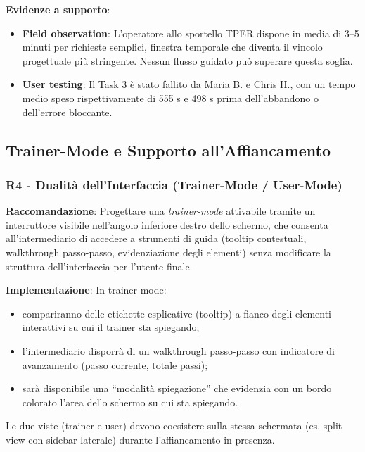 ﻿\documentclass[11pt,a4paper]{article}
\begin{document}
\textbf{Evidenze a supporto}:
\begin{itemize}
    \item \textbf{Field observation}: L'operatore allo sportello TPER dispone in media
    di 3--5 minuti per richieste semplici, finestra temporale che
    diventa il vincolo progettuale pi\`u stringente. Nessun flusso guidato pu\`o
    superare questa soglia.
    \item \textbf{User testing}: Il Task 3 \`e stato fallito da Maria B.
    e Chris H., con un tempo medio speso rispettivamente di 555 s e 498 s
    prima dell'abbandono o dell'errore bloccante.
\end{itemize}



\subsection{Trainer-Mode e Supporto all'Affiancamento}

\subsubsection{R4 - Dualit\`a dell'Interfaccia (Trainer-Mode / User-Mode)}
\label{rec:R4}

\textbf{Raccomandazione}: Progettare una \textit{trainer-mode} attivabile
tramite un interruttore visibile nell'angolo inferiore destro dello schermo,
che consenta all'intermediario di accedere a strumenti di guida (tooltip
contestuali, walkthrough passo-passo, evidenziazione degli elementi)
senza modificare la struttura dell'interfaccia per l'utente finale.

\textbf{Implementazione}: In trainer-mode:
\begin{itemize}
    \item compariranno delle etichette esplicative (tooltip) a fianco degli
    elementi interattivi su cui il trainer sta spiegando;
    \item l'intermediario disporr\`a di un walkthrough passo-passo con
    indicatore di avanzamento (passo corrente, totale passi);
    \item sar\`a disponibile una “modalit\`a spiegazione” che evidenzia con un
    bordo colorato l'area dello schermo su cui sta spiegando.
\end{itemize}
Le due viste (trainer e user) devono coesistere sulla stessa schermata
(es. split view con sidebar laterale) durante l'affiancamento in presenza.
\end{document}
